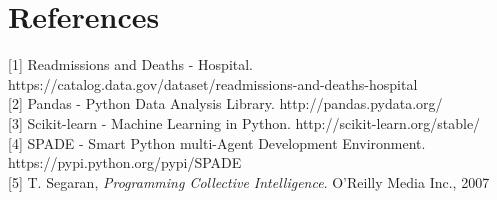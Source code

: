 \documentclass{article}
\begin{document}
\section{References}

{[}1{]} Readmissions and Deaths - Hospital. https://catalog.data.gov/dataset/readmissions-and-deaths-hospital \\
{[}2{]} Pandas - Python Data Analysis Library. http://pandas.pydata.org/ \\
{[}3{]} Scikit-learn - Machine Learning in Python. http://scikit-learn.org/stable/ \\
{[}4{]} SPADE - Smart Python multi-Agent Development Environment. https://pypi.python.org/pypi/SPADE \\
{[}5{]} T. Segaran, \textit{Programming Collective Intelligence}. O'Reilly Media Inc., 2007 \\
\end{document}
